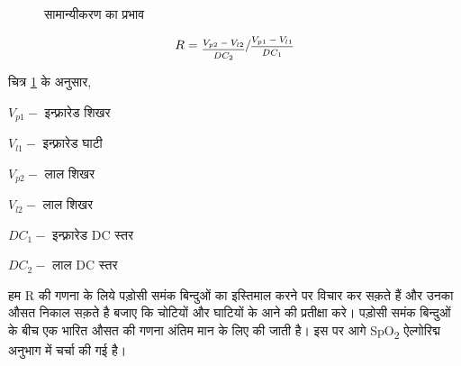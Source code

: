 	\begin{figure}[ht!]
	\centering
	\hfill
	\caption{सामान्यीकरण का प्रभाव}
	\label{fig:ppgnorm}
	\end{figure}

	\begin{equation}
	\label{eq:calc}	
	R = \sfrac{\frac{V_{p2} - V_{l2}}{DC_2}}{\frac{V_{p1} - V_{l1}}{DC_1}}
	\end{equation}	 
	
	चित्र \ref{fig:ppgnorm} के अनुसार,
	
	$V_{p1} - $  इन्फ़्रारेड शिखर
	
	$V_{l1} - $  इन्फ़्रारेड घाटी
	
	$V_{p2} - $  लाल शिखर
	
	$V_{l2} - $  लाल शिखर
	
	$DC_1 - $  इन्फ़्रारेड DC स्तर
	
	$DC_2 - $  लाल DC स्तर
	
	\medskip
	
	हम R की गणना के लिये पड़ोसी समंक बिन्दुओं का इस्तिमाल करने पर विचार कर सक़ते हैं और उनका औसत निकाल सक़ते है बजाए कि चोटियों और घाटियों के आने की प्रतीक्षा करे। पड़ोसी समंक बिन्दुओं के बीच एक भारित औसत \cite{wuk} की गणना अंतिम मान के लिए की जाती है। इस पर आगे SpO\textsubscript{2} ऐल्गोरिद्म अनुभाग में चर्चा की गई है।
	

